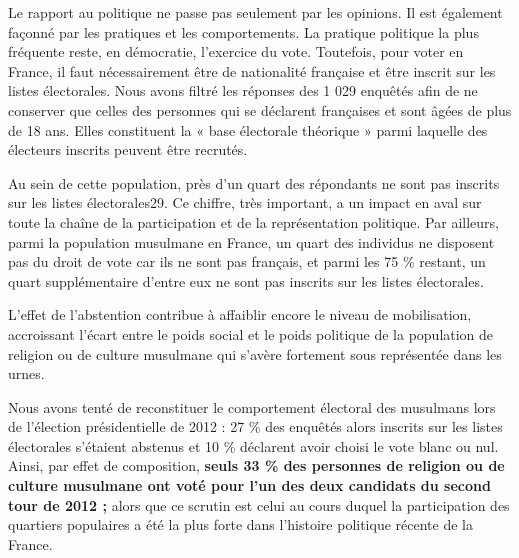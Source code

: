 Le rapport au politique ne passe pas seulement par les opinions. Il est
également façonné par les pratiques et les comportements. La pratique
politique la plus fréquente reste, en démocratie, l'exercice du vote.
Toutefois, pour voter en France, il faut nécessairement être de
nationalité française et être inscrit sur les listes électorales. Nous
avons filtré les réponses des 1 029 enquêtés afin de ne conserver que
celles des personnes qui se déclarent françaises et sont âgées de plus
de 18 ans. Elles constituent la « base électorale théorique » parmi
laquelle des électeurs inscrits peuvent être recrutés.



Au sein de cette population, près d'un quart des répondants ne sont pas
inscrits sur les listes électorales29. Ce chiffre, très important, a un
impact en aval sur toute la chaîne de la participation et de la
représentation politique. Par ailleurs, parmi la population musulmane en
France, un quart des individus ne disposent pas du droit de vote car ils
ne sont pas français, et parmi les 75 \% restant, un quart
supplémentaire d'entre eux ne sont pas inscrits sur les listes
électorales.

L'effet de l'abstention contribue à affaiblir encore le niveau de
mobilisation, accroissant l'écart entre le poids social et le poids
politique de la population de religion ou de culture musulmane qui
s'avère fortement sous représentée dans les urnes.

Nous avons tenté de reconstituer le comportement électoral des musulmans
lors de l'élection présidentielle de 2012 : 27 \% des enquêtés alors
inscrits sur les listes électorales s'étaient abstenus et 10 \%
déclarent avoir choisi le vote blanc ou nul.
Ainsi, par effet de
composition, \textbf{seuls 33 \% des personnes de religion ou de culture
musulmane ont voté pour l'un des deux candidats du second tour de 2012
;} alors que ce scrutin est celui au cours duquel la participation des
quartiers populaires a été la plus forte dans l'histoire politique
récente de la France.



